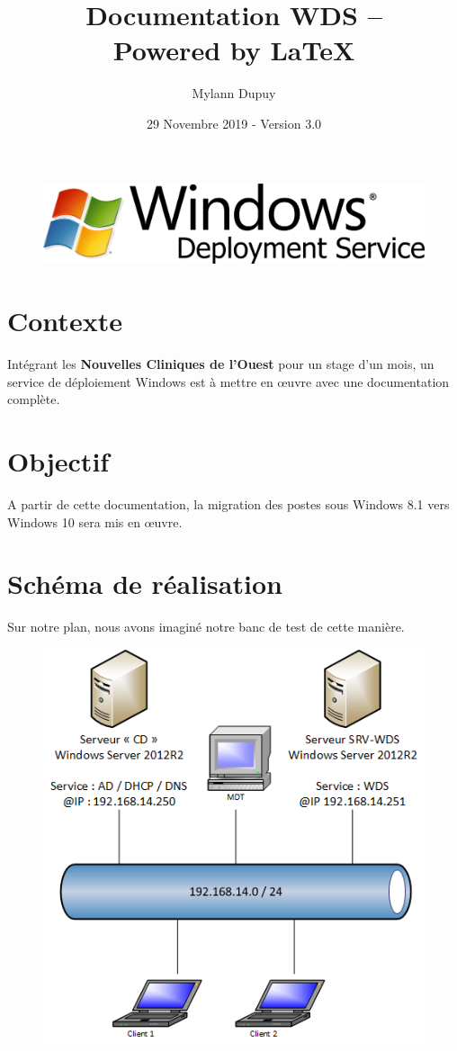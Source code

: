\documentclass[11pt,a4paper,oneside]{article}
\author{Mylann Dupuy}
\title{Documentation WDS --  \\ Powered by \LaTeX}
\date{29 Novembre 2019 - Version 3.0}
\begin{document}
\maketitle
\begin{figure}[hbtp]
\centering
\includegraphics[scale=1]{Pictures/bannierewds.png}
\end{figure}
\newpage

\tableofcontents
\newpage
\setcounter{page}{3}
\newpage

\section{Contexte}
Intégrant les \textbf{Nouvelles Cliniques de l'Ouest} pour un stage d'un mois, un service de déploiement Windows est à mettre en \oe{}uvre avec une documentation complète.

\section{Objectif}
A partir de cette documentation, la migration des postes sous Windows 8.1 vers Windows 10 sera mis en \oe{}uvre.

\section{Schéma de réalisation}
Sur notre plan, nous avons imaginé notre banc de test de cette manière. \\ 
\begin{figure}[hbtp]
\centering
\includegraphics[scale=1.2]{Pictures/Plan.png}
\end{figure}
\newpage
\end{document}
